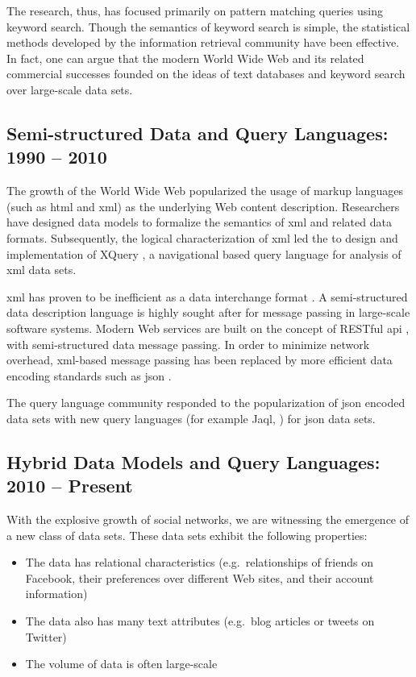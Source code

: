 		The research, thus, has focused primarily on pattern matching queries using keyword search.  Though the semantics of keyword search is simple, the statistical methods developed by the information retrieval community \cite{salton-88, robertson-09, dumais-88} have been effective.  In fact, one can argue that the modern World Wide Web and its related commercial successes founded on the ideas of text databases and keyword search over large-scale data sets.
		
	\subsection{Semi-structured Data and Query Languages:  1990 -- 2010}
		The growth of the World Wide Web popularized the usage of markup languages (such as \gls{html} and \gls{xml}) as the underlying Web content description.  Researchers have designed data models \cite{suciu-98} to formalize the semantics of \gls{xml} and related data formats.  Subsequently, the logical characterization of \gls{xml} led the to design and implementation of XQuery \cite{xquery-10}, a navigational based query language for analysis of \gls{xml} data sets.
		
		\gls{xml} has proven to be inefficient as a data interchange format \cite{schneider-14}.  A semi-structured data description language is highly sought after for message passing in large-scale software systems.  Modern Web services are built on the concept of RESTful \gls{api} \cite{restful-11}, with semi-structured data message passing.  In order to minimize network overhead, \gls{xml}-based message passing has been replaced by more efficient data encoding standards such as \gls{json} \cite{json}.
		
		The query language community responded to the popularization of \gls{json} encoded data sets with new query languages \cite{simeon-13} (for example Jaql, \cite{ibm-jaql}) for \gls{json} data sets.
	
	\subsection{Hybrid Data Models and Query Languages: 2010 -- Present}
		With the explosive growth of social networks, we are witnessing the emergence of a new class of data sets.  These data sets exhibit the following properties:
		
		\begin{itemize}
			\item The data has relational characteristics (e.g.~relationships of friends on Facebook, their preferences over different Web sites, and their account information)
			\item The data also has many text attributes (e.g.~blog articles or tweets on Twitter)
			\item The volume of data is often large-scale
		\end{itemize}
		

